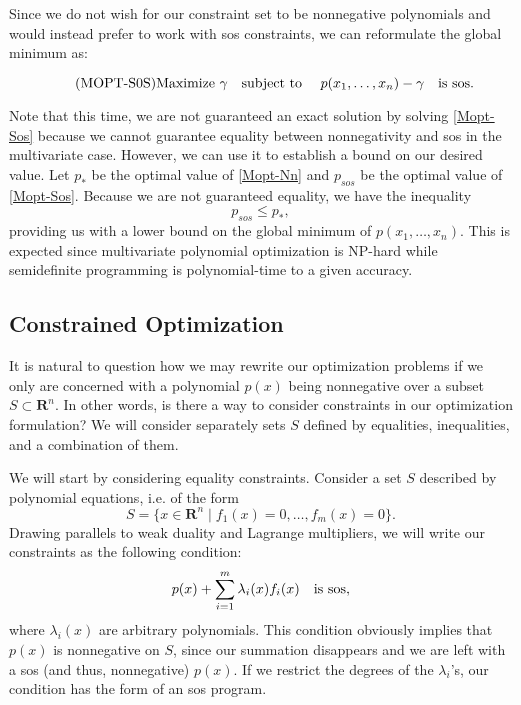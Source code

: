	Since we do not wish for our constraint set to be nonnegative polynomials and would instead prefer to work with sos constraints, we can reformulate the global minimum as:
	
	\begin{equation} \label{Mopt-Sos} \tag{MOPT-S0S}
	\textnormal{Maximize } \gamma \quad \textnormal{subject to } \quad p(x_1, \dots, x_n) - \gamma \quad \textnormal{is sos}.
	\end{equation}
	
	Note that this time, we are not guaranteed an exact solution by solving \eqref{Mopt-Sos} because we cannot guarantee equality between nonnegativity and sos in the multivariate case. However, we can use it to establish a bound on our desired value. Let $p_*$ be the optimal value of \eqref{Mopt-Nn} and $p_{sos}$ be the optimal value of \eqref{Mopt-Sos}. Because we are not guaranteed equality, we have the inequality 
	$$
	p_{sos} \leq p_*,
	$$
	providing us with a lower bound on the global minimum of $p(x_1, \dots, x_n)$. This is expected since multivariate polynomial optimization is NP-hard while semidefinite programming is polynomial-time to a given accuracy. 
	
	\subsection{Constrained Optimization}

	It is natural to question how we may rewrite our optimization problems if we only are concerned with a polynomial $p(x)$ being nonnegative over a subset $S \subset \mathbf{R}^n$. In other words, is there a way to consider constraints in our optimization formulation? We will consider separately sets $S$ defined by equalities, inequalities, and a combination of them.
	
	We will start by considering equality constraints. Consider a set $S$ described by polynomial equations, i.e. of the form
	$$
	S = \{x \in \mathbf{R}^n \mid f_1(x) = 0, \dots, f_m(x) = 0\}.
	$$
	Drawing parallels to weak duality and Lagrange multipliers, we will write our constraints as the following condition:
	\begin{equation} \label{equal constraints}
		p(x) + \sum_{i=1}^{m} \lambda_i(x) f_i(x) \quad \textnormal{is sos},
	\end{equation}
	where $\lambda_i(x)$ are arbitrary polynomials. This condition obviously implies that $p(x)$ is nonnegative on $S$, since our summation disappears and we are left with a sos (and thus, nonnegative) $p(x)$. If we restrict the degrees of the $\lambda_i$'s, our condition has the form of an sos program.
	
